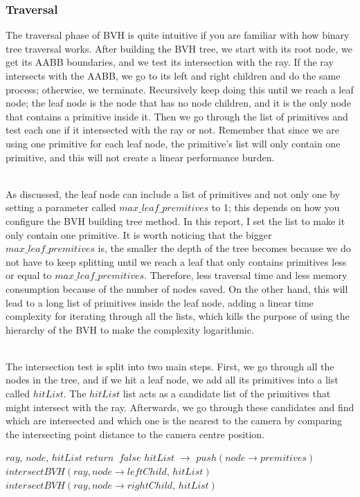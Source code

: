 \documentclass[11pt,a4paper]{article}
\begin{document}
\subsubsection{Traversal}
The traversal phase of BVH is quite intuitive if you are familiar with how binary tree traversal works. After building the BVH tree, we start with its root node, we get its AABB boundaries, and we test its intersection with the ray. If the ray intersects with the AABB, we go to its left and right children and do the same process; otherwise, we terminate. Recursively keep doing this until we reach a leaf node; the leaf node is the node that has no node children, and it is the only node that contains a primitive inside it. Then we go through the list of primitives and test each one if it intersected with the ray or not. Remember that since we are using one primitive for each leaf node, the primitive's list will only contain one primitive, and this will not create a linear performance burden. 

\noindent
\\
As discussed, the leaf node can include a list of primitives and not only one by setting a parameter called $max\_leaf\_premitives$ to 1; this depends on how you configure the BVH building tree method. In this report, I set the list to make it only contain one primitive. It is worth noticing that the bigger $max\_leaf\_premitives$ is, the smaller the depth of the tree becomes because we do not have to keep splitting until we reach a leaf that only contains primitives less or equal to $max\_leaf\_premitives$. Therefore, less traversal time and less memory consumption because of the number of nodes saved. On the other hand, this will lead to a long list of primitives inside the leaf node, adding a linear time complexity for iterating through all the lists, which kills the purpose of using the hierarchy of the BVH to make the complexity logarithmic.


\noindent
\\
The intersection test is split into two main steps. First, we go through all the nodes in the tree, and if we hit a leaf node, we add all its primitives into a list called $hitList$. The $hitList$ list acts as a candidate list of the primitives that might intersect with the ray. Afterwards, we go through these candidates and find which are intersected and which one is the nearest to the camera by comparing the intersecting point distance to the camera centre position.

\begin{algorithm}[H]
	\caption{$intersectBVH$}\label{alg:alg1}
	\begin{algorithmic}
		\Require $ray$, $node$, $hitList$
			\State $return\;\;false$
		\EndIf
		    \State $hitList$ $\rightarrow$ $push(node \rightarrow premitives)$
		\Else
			\State $intersectBVH(ray, node \rightarrow leftChild,\, hitList)$
			\State $intersectBVH(ray, node \rightarrow rightChild,\, hitList)$
		\EndIf
	\end{algorithmic}
\end{algorithm}
\end{document}
